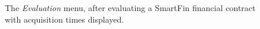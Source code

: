 \documentclass{article}
\begin{document}
\begin{figure}[h]
    \centering
    \caption{The \textit{Evaluation} menu, after evaluating a SmartFin financial contract with acquisition times displayed.}
    \label{UG:fig:eval-scale-obs-evaluated-times}
\end{figure}
\end{document}

